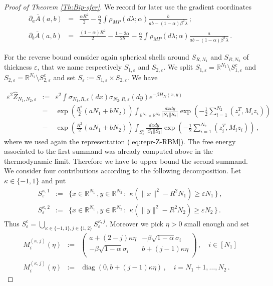 \documentclass[10pt,oneside,a4paper,reqno]{amsart}  %
\def\be{\begin{equation}}
\def\ee{\end{equation}}
\def\bea{\begin{eqnarray}}
\def\eea{\end{eqnarray}}
\def\nn{\nonumber}
\DeclareMathOperator{\diag}{diag}
\def\a{\alpha}
\def\e{\varepsilon}
\def\b{\beta}
\def\l{\lambda}
\def\r{\rho}
\def\s{\sigma}
\def\R{\mathbb{R}}
\theoremstyle{plain}
\numberwithin{equation}{section}
\newcommand{\pecetta}[1]{
$\phantom .$
\bigskip
\par\noindent
\colorbox{light}{\begin{minipage}{12cm}#1\end{minipage}}
\bigskip
\par\noindent
}
\begin{document}
\begin{proof}[Proof of Theorem \ref{Th:Bip-sfer}]
We record for later use the gradient coordinates 
\bea
\partial_a \bar A(a,b)&=&\frac{\a R^2}{2}-\frac\a2\int \r_{MP}(d\l;\a)\frac{b}{ab- (1-\a)\b^2\l}\,;\label{eq:grad1RBM}\\
\partial_b \bar A(a,b)&=&\frac{(1-\a)R^2}{2} -\frac{1-2\a}{2b}-\frac\a2\int \r_{MP}(d\l;\a)\frac{a}{ab- (1-\a)\b^2\l}\,.\label{eq:grad2RBM}
\eea


For the reverse bound consider again  spherical shells around $S_{R,N_1}$ and $S_{R,N_2}$ of thickness $\e$, that we name respectively $S_{1,\e}$ and $S_{2,\e}$. We split $S_{1,\e}=\R^{N_1}\setminus S^c_{1,\e}$ and $S_{2,\e}=\R^{N_2}\setminus S^c_{2,\e}$ and set $S_{\e}:=S_{1,\e}\times S_{2,\e}$. We have

\bea
\e^2 \widehat Z_{N_1,N_2,\e}&:=&\e^2\int\s_{N_1, R,\e}(dx)\s_{N_2,R,\e}(dy)e^{-\b H_N(x,y)}\nn\\
&=&\exp\left(\frac {R^2}{2} (aN_1+b N_2)\right) \int_{\R^{N_1}\times \R^{N_2}} \frac{dxdy}{|S_1||S_2|}\exp\left( -\frac 1 2 \sum_{i=1}^{N_2} (z_i^T,M_i z_i)\right)\nn\\
&-&\exp\left(\frac {R^2}{2} (aN_1+b N_2)\right) \int_{S^c_{\e}} \frac{dxdy}{|S_1||S_2|}\exp\left( -\frac 1 2 \sum_{i=1}^{N_2} (z_i^T,M_i z_i)\right)\label{eq:II-termRBM}\,,
\eea
where we used again the representation (\ref{eq:repr-Z-RBM}). The free energy associated to the first summand was already computed above in the thermodynamic limit. Therefore we have to upper bound the second summand. We consider four contributions according to the following decomposition. Let $\kappa\in\{-1,1\}$ and put
\bea
S_\e^{\kappa,1}&:=&\{x\in\R^{N_1}\,, y\in\R^{N_2}\,:\,\, \kappa(\|x\|^2-R^2N_1)\geq \e N_1\,\}\,,\nn\\
S_\e^{\kappa,2}&:=&\{x\in\R^{N_1}\,, y\in\R^{N_2}\,:\,\, \kappa(\|y\|^2-R^2N_2)\geq \e N_2\,\}\,.\nn 
\eea
Thus $S_\e^c=\bigcup_{\kappa\in\{-1,1\},j\in\{1,2\}}S_\e^{\kappa,j}$. Moreover we pick $\eta>0$ small enough and set
\bea
M^{(\kappa,j)}_i(\eta) &:=&
  \left( {\begin{array}{cc}
   a+(2-j)\kappa\eta & -\b\sqrt{1-\a}\s_i \\
   -\b\sqrt{1-\a}\s_i & b+(j-1)\kappa\eta \\
\end{array} } \right)\,,\quad i\in[N_1]\nn\\ 
M^{(\kappa,j)}_i(\eta)&:=&\diag(0,b+(j-1)\kappa\eta)\,,\quad i=N_1+1,\ldots , N_2\,.\nn
\eea



\end{proof}
\end{document}
